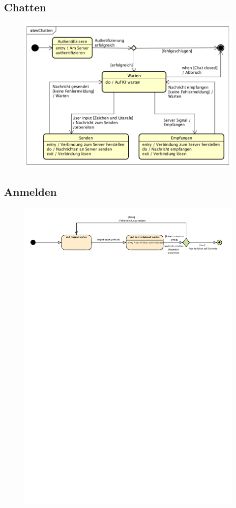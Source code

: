 \subsection*{Chatten}
\begin{figure}[h!]
	\centering
	\includegraphics[width = 0.6\linewidth]{docs/4_Zustandsdiagramme/Patrick/STM_Chatten.png}
	\label{fig:STM_Chatten}
\end{figure}

\subsection*{Anmelden}
\begin{figure}[h!]
	\centering
	\includegraphics[width = 0.8\linewidth]{docs/4_Zustandsdiagramme/Marius/Anmelden.pdf}
	\label{fig:STM_Anmelden}
\end{figure}

